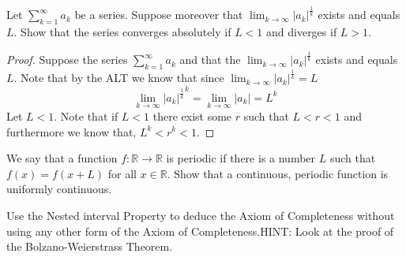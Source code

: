 \documentclass[12pt]{article}
\makeatletter
\theoremstyle{homework}
\newenvironment{exercise}[1]
{\def\@currentlabel{#1}\exercisecore}
{\endexercisecore}
\newcommand{\Reals}{\ensuremath{\mathbb R}}
\makeatother
\begin{document}
\begin{exercise}{4} Let $\sum_{k = 1}^{\infty}a_k$ be a series. Suppose moreover that $\lim_{k \to \infty} |a_k|^{\frac{1}{k}}$
  exists and equals $L$. Show that the series converges absolutely if $L<1$ and diverges if $L>1$. \\
\begin{proof}
  Suppose the series $\sum_{k = 1}^{\infty}a_k$ and that the $\lim_{k \to \infty} |a_k|^{\frac{1}{k}}$
  exists and equals $L$. Note that by the ALT we know that since $\lim_{k \to \infty} |a_k|^{\frac{1}{k}} = L$
  \begin{equation*}
    \lim_{k \to \infty} {|a_k|^{\frac{1}{k}}}^k =  \lim_{k \to \infty} |a_k| = L^k
  \end{equation*}
  Let $L < 1$. Note that if $L<1$ there exist some $r$ such that $L<r<1$ and furthermore we know that, $L^k<r^k<1$.
\end{proof}









\end{exercise}
\vspace{.5in}










\begin{exercise}{5} We say that a function $f: \Reals \to \Reals$ is periodic if there is a number $L$ such that $f(x) = f(x + L)$
  for all $x \in \Reals$. Show that a continuous, periodic function is uniformly continuous.\\
  
\end{exercise}
\vspace{.5in}

\begin{exercise}{6} Use the Nested interval Property to deduce the Axiom of Completeness without using any other form of the Axiom of
  Completeness.HINT: Look at the proof of the Bolzano-Weierstrass Theorem.\\
  
\end{exercise}
\vspace{.5in}
\end{document}
